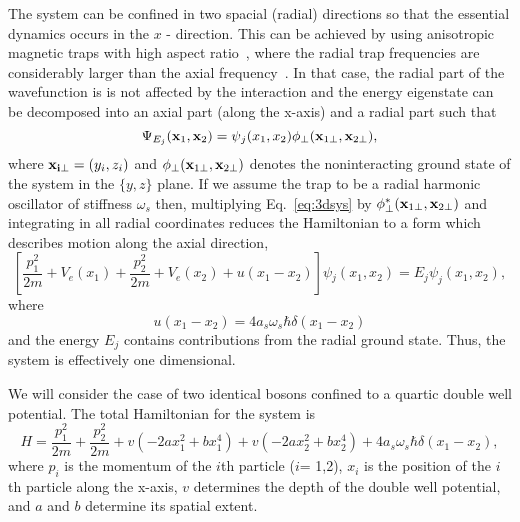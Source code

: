 \documentclass{article}
\begin{document}
The system can be confined in two spacial (radial) directions so that the essential dynamics occurs in the $x$ - direction. This can be achieved by using anisotropic magnetic traps with high aspect ratio~\cite{olshanii:1d},  where the radial trap frequencies are considerably larger than the  axial frequency~\cite{petrov:1d}. In that case, the radial part of the wavefunction is is not affected by the interaction and the energy eigenstate can be decomposed into an axial part (along the x-axis) and a radial part such that
%
\begin{equation}
\Psi_{E_j}({\bf x}_1, {\bf x}_2) =\psi{_j}(x_1,x_2) \phi_\bot ({\bf x}_{1\bot},{\bf x}_{2\bot}),
\end{equation}
%
where ${\bf x_{i\bot}}=(y_i,z_i)$ and  $\phi_\bot ({\bf x}_{1\bot},{\bf x}_{2\bot})$ denotes the noninteracting ground state of the system in the $\lbrace y, z\rbrace$ plane.  If we assume the trap to be a radial harmonic oscillator of stiffness $\omega_s$ then, multiplying Eq.~\eqref{eq:3dsys} by $\phi^*_\bot ({\bf x}_{1\bot},{\bf x}_{2\bot})$ and integrating in all radial coordinates reduces the Hamiltonian to a form which describes motion along the axial direction,
%
\begin{equation}
\left[ \frac{p^2_1}{2m}+V_e(x_1) + \frac{p^2_2}{2m} + V_e(x_2)+u(x_1-x_2) \right] \psi{_j}(x_1,x_2)
=E_j \psi_{j}(x_1,x_2),
\end{equation}
%
where
\begin{equation}
u(x_1-x_2) = 4a_s \omega_s \hbar \delta(x_1-x_2)
\end{equation}
%
and the energy $E_j$ contains contributions from the radial ground state. Thus, the system is effectively one dimensional.

We will consider the case of  two identical bosons  confined to a quartic double well potential.
The total Hamiltonian for the system is 
%
\begin{equation}
H =\frac{p^2_1}{2m}+\frac{p^2_2}{2m}+v(-2a x_1^2+b x_1^4) +v(-2a x_2^2+b x_2^4)+4a_s \omega_s \hbar \delta(x_1-x_2) ,
\end{equation}
%
where $p_i$ is the momentum of the $i$th particle ($i$= 1,2), $x_i$ is the position of the $i$th particle along the x-axis,  $v$ determines the depth of the double well potential, and $a$ and $b$ determine its spatial extent.
\end{document}
